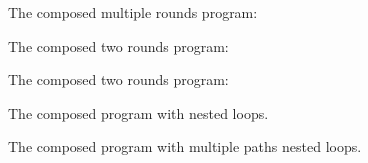 \begin{example}[$\kw{mRCompose}$]
The composed multiple rounds program:
\\

\end{example}
\begin{example}[$\kw{tRCompose}$]
The composed two rounds program:
\\

\end{example}
\begin{example}[$\kw{seqCompose}$]
    The composed two rounds program:
    \\
    
\end{example}
\begin{example}[$\kw{jumboS}$]
    The composed program with nested loops. 
    \\
    
\end{example}
\begin{example}[$\kw{jumbo}$]
    The composed program with multiple paths nested loops. 
    \\
    
\end{example}